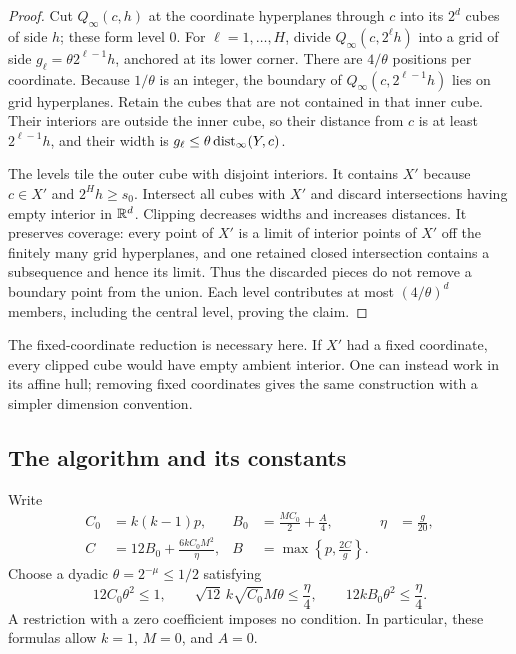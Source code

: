 \begin{proof}
Cut $Q_\infty(c,h)$ at the coordinate hyperplanes through $c$ into its
$2^d$ cubes of side $h$; these form level $0$. For
$\ell=1,\ldots,H$, divide $Q_\infty(c,2^\ell h)$ into a grid of side
$g_\ell=\theta2^{\ell-1}h$, anchored at its lower corner. There are
$4/\theta$ positions per coordinate. Because $1/\theta$ is an integer,
the boundary of $Q_\infty(c,2^{\ell-1}h)$ lies on grid hyperplanes.
Retain the cubes that are not contained in that inner cube. Their
interiors are outside the inner cube, so their distance from $c$ is at
least $2^{\ell-1}h$, and their width is
$g_\ell\le\theta\operatorname{dist}_\infty(Y,c)$.

The levels tile the outer cube with disjoint interiors. It contains
$X'$ because $c\in X'$ and $2^Hh\ge s_0$. Intersect all cubes with
$X'$ and discard intersections having empty interior in $\mathbb R^d$.
Clipping decreases widths and increases distances. It preserves
coverage: every point of $X'$ is a limit of interior points of $X'$
off the finitely many grid hyperplanes, and one retained closed
intersection contains a subsequence and hence its limit. Thus the
discarded pieces do not remove a boundary point from the union.
Each level contributes at most $(4/\theta)^d$ members, including the
central level, proving the claim.
\end{proof}

The fixed-coordinate reduction is necessary here. If $X'$ had a fixed
coordinate, every clipped cube would have empty ambient interior. One
can instead work in its affine hull; removing fixed coordinates gives
the same construction with a simpler dimension convention.

\subsection{The algorithm and its constants}

Write
\begin{equation}\label{eq:regridding-constants}
\begin{aligned}
 C_0&=k(k-1)p, & B_0&=\frac{MC_0}{2}+\frac A4,
 &\eta&=\frac g{20},\\
 C&=12B_0+\frac{6kC_0M^2}{\eta},
 & B&=\max\left\{p,\frac{2C}{g}\right\}.
\end{aligned}
\end{equation}
Choose a dyadic $\theta=2^{-\mu}\le1/2$ satisfying
\begin{equation}\label{eq:regridding-theta}
 12C_0\theta^2\le1,\qquad
 \sqrt{12}\,k\sqrt{C_0}M\theta\le\frac\eta4,\qquad
 12kB_0\theta^2\le\frac\eta4.
\end{equation}
A restriction with a zero coefficient imposes no condition. In
particular, these formulas allow $k=1$, $M=0$, and $A=0$.

